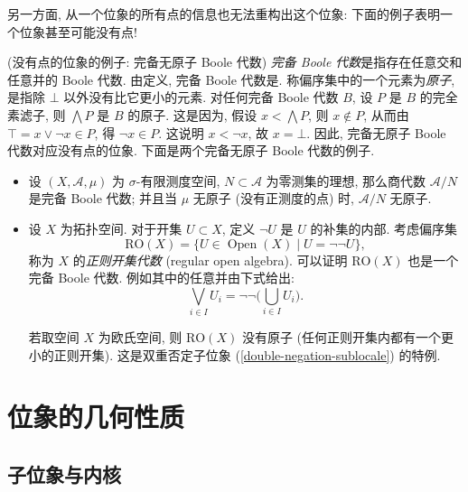 另一方面, 从一个位象的所有点的信息也无法重构出这个位象: 下面的例子表明一个位象甚至可能没有点!

\begin{example}
	[label={complete-atomless-Boolean-algebra}]
	{(没有点的位象的例子: 完备无原子 Boole 代数)}
	\emph{完备 Boole 代数}是指存在任意交和任意并的 Boole 代数.
	由定义, 完备 Boole 代数是\fm.
	称偏序集中的一个元素为\emph{原子}, 是指除 $\bot$ 以外没有比它更小的元素.
	对任何完备 Boole 代数 $B$, 设 $P$ 是 $B$ 的完全素滤子,
	则 $\bigwedge P$ 是 $B$ 的原子. 这是因为, 假设 $x < \bigwedge P$,
	则 $x\notin P$, 从而由 $\top=x\vee\neg x\in P$, 得 $\neg x \in P$. 这说明 $x<\neg x$, 故 $x=\bot$.
	因此, 完备无原子 Boole 代数对应没有点的位象.
	下面是两个完备无原子 Boole 代数的例子.
	
	\begin{itemize}
		\item 设 $(X,\mathcal A,\mu)$ 为 $\sigma$-有限测度空间, $N\subset \mathcal A$ 为零测集的理想,
		那么商代数 $\mathcal A / N$ 是完备 Boole 代数; 并且当 $\mu$ 无原子 (没有正测度的点) 时, $\mathcal A/N$ 无原子.
		\item	
	设 $X$ 为拓扑空间. 对于开集 $U\subset X$, 定义 $\neg U$ 是 $U$ 的补集的内部.
	考虑偏序集
	$$
	\text{RO}(X)
	=
	\big\{U\in\operatorname{Open}(X)\mid U = \neg\neg U\big\},
	$$
	称为 $X$ 的\emph{正则开集代数} (regular open algebra). 可以证明 $\text{RO}(X)$ 也是一个完备 Boole 代数\footnotemark. 例如其中的任意并由下式给出:
	$$
	\bigvee_{i\in I}U_i = \neg\neg\Big(\bigcup_{i\in I}U_i\Big).
	$$
	
	若取空间 $X$ 为欧氏空间, 则 $\text{RO}(X)$ 没有原子 (任何正则开集内都有一个更小的正则开集). 这是双重否定子位象 (\ref{double-negation-sublocale}) 的特例.
	\end{itemize}
\end{example}

\section{位象的几何性质}

\subsection{子位象与内核}

